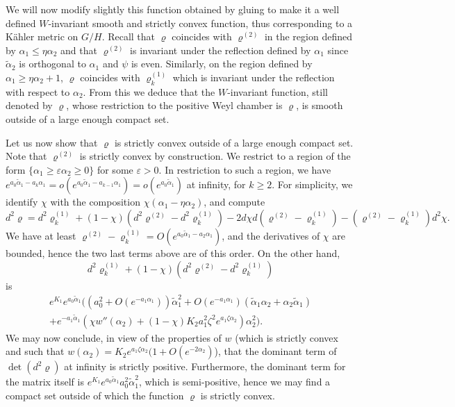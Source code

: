 \documentclass[JEP,XML,SOM,Unicode, NoEqCountersInSection, NoFloatCountersInSection]{cedram}
\let\epsilon\varepsilon
\theoremstyle{plain}
\theoremstyle{definition}
\newcommand{\ta}{\tilde \alpha}
\newcommand{\rhodeux}{\varrho^{(2)}}
\newcommand{\rhoun}{\varrho^{(1)}}
\begin{document}
We will now modify slightly this function obtained by gluing to make it a well defined $W$-invariant
smooth and strictly convex function, thus corresponding to a Kähler metric on $G/H$.
Recall that $\varrho$ coincides with $\rhodeux$ in the region defined by $\alpha_1\leq \eta\alpha_2$
and that $\rhodeux$ is invariant under the reflection defined by $\alpha_1$ since $\ta_2$ is
orthogonal to $\alpha_1$ and $\psi$ is even. Similarly, on the region defined by
$\alpha_1\geq \eta\alpha_2+1$, $\varrho$ coincides with $\rhoun_k$ which is invariant
under the reflection with respect to $\alpha_2$.
From this we deduce that the $W$-invariant function, still denoted by $\varrho$,
whose restriction to the positive Weyl chamber is $\varrho$, is smooth outside of a
large enough compact set.

Let us now show that $\varrho$ is strictly convex outside of a large enough compact set.
Note that $\rhodeux$ is strictly convex by construction.
We restrict to a region of the form $\{\alpha_1\geq \epsilon \alpha_2\geq 0\}$ for some $\epsilon>0$.
In restriction to such a region, we have $e^{a_0\ta_1-a_k\alpha_1}=o(e^{a_0\ta_1-a_{k-1}\alpha_1})=o(e^{a_0\ta_1})$
at infinity, for $k\geq 2$.
For simplicity, we identify $\chi$ with the composition $\chi(\alpha_1-\eta \alpha_2)$, and compute
\[ d^2\varrho=d^2\rhoun_k +(1-\chi)(d^2\rhodeux-d^2\rhoun_k)-2d\chi d(\rhodeux-\rhoun_k)-(\rhodeux-\rhoun_k)d^2\chi. \]
We have at least $\rhodeux-\rhoun_k=O(e^{a_0\ta_1-a_2\alpha_1})$,
and the derivatives of $\chi$ are bounded, hence the two last terms above are of this order.
On the other hand, $$d^2\rhoun_k +(1-\chi)(d^2\rhodeux-d^2\rhoun_k)$$ is
\begin{multline*}
e^{K_1}e^{a_0\ta_1}\big( (a_0^2+O(e^{-a_1\alpha_1}))\ta_1^2 + O(e^{-a_1\alpha_1})(\ta_1\alpha_2+\alpha_2\ta_1)
\\ +e^{-a_1\ta_1}(\chi w''(\alpha_2)+(1-\chi)K_2a_1^2\zeta^2e^{a_1\zeta\alpha_2})\alpha_2^2 \big).
\end{multline*}
We may now conclude, in view of the properties of $w$ (which is strictly convex and such that
$w(\alpha_2)=K_2e^{a_1\zeta\alpha_2}(1+O(e^{-2\alpha_2})$), that the dominant term of $\det(d^2\varrho)$
at infinity is strictly positive.
Furthermore, the dominant term for the matrix itself is $e^{K_1}e^{a_0\ta_1}a_0^2\ta_1^2$, which is
semi-positive, hence we may find a compact set outside of which the function $\varrho$ is strictly convex.
\end{document}

